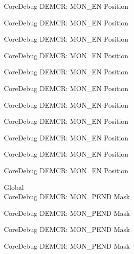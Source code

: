 \begin{DoxyRefList}
\label{deprecated__deprecated000197}%
%
Core\+Debug DEMCR\+: MON\+\_\+\+EN Position 

\label{deprecated__deprecated000339}%
%
Core\+Debug DEMCR\+: MON\+\_\+\+EN Position 

\label{deprecated__deprecated000415}%
%
Core\+Debug DEMCR\+: MON\+\_\+\+EN Position 

\label{deprecated__deprecated000504}%
%
Core\+Debug DEMCR\+: MON\+\_\+\+EN Position 

\label{deprecated__deprecated000606}%
%
Core\+Debug DEMCR\+: MON\+\_\+\+EN Position 

\label{deprecated__deprecated000731}%
%
Core\+Debug DEMCR\+: MON\+\_\+\+EN Position 

\label{deprecated__deprecated000875}%
%
Core\+Debug DEMCR\+: MON\+\_\+\+EN Position 

\label{deprecated__deprecated001017}%
%
Core\+Debug DEMCR\+: MON\+\_\+\+EN Position 

\label{deprecated__deprecated001093}%
%
Core\+Debug DEMCR\+: MON\+\_\+\+EN Position 

\label{deprecated__deprecated001182}%
%
Core\+Debug DEMCR\+: MON\+\_\+\+EN Position 

\label{deprecated__deprecated001284}%
%
Core\+Debug DEMCR\+: MON\+\_\+\+EN Position  
\item[Global \doxylink{group___c_m_s_i_s___core_debug_ga68ec55930269fab78e733dcfa32392f8}{Core\+Debug\+\_\+\+DEMCR\+\_\+\+MON\+\_\+\+PEND\+\_\+\+Msk} ]\hfill \\
\label{deprecated__deprecated000052}%
%
Core\+Debug DEMCR\+: MON\+\_\+\+PEND Mask 

\label{deprecated__deprecated000196}%
%
Core\+Debug DEMCR\+: MON\+\_\+\+PEND Mask 

\label{deprecated__deprecated000338}%
%
Core\+Debug DEMCR\+: MON\+\_\+\+PEND Mask 

\label{deprecated__deprecated000414}%
%
Core\+Debug DEMCR\+: MON\+\_\+\+PEND Mask 


\end{DoxyRefList}

